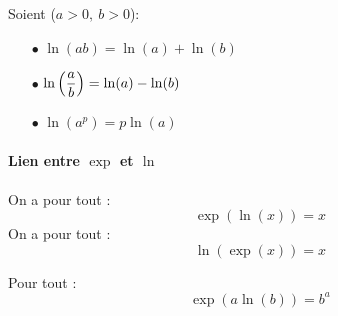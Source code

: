 \documentclass[a4paper, 11pt]{article}
\begin{document}
\begin{prop}
Soient ($a>0,\ b>0$):
\begin{itemize}
\item[$\bullet$] $\ln{(ab)}=\ln(a)+\ln(b) $
\item[$\bullet$] $\ln{\left(\displaystyle\frac{a}{b}\right)}=\ln(a) -\ln(b)$
\item[$\bullet$] $\ln{(a^p)}=p\ln(a)$
\end{itemize}
\end{prop}



\paragraph{Lien entre $\exp$ et $\ln$}
\begin{prop}
On a pour tout  : 
$$\exp(\ln(x)) =x$$
On a pour tout  : 
$$\ln(\exp(x)) =x$$

Pour tout  :
$$\exp(a\ln(b)) =b^a$$

\end{prop}
\vspace{0.5cm}
\end{document}
